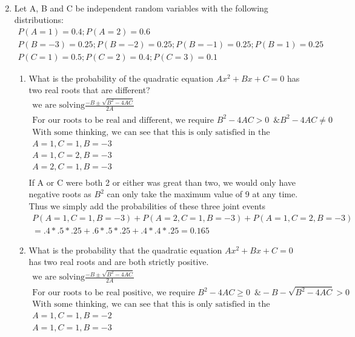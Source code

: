 \documentclass[11pt]{article}
\begin{document}
\begin{enumerate}
\begin{enumerate}
\begin{gather}
	\end{gather}
\end{enumerate}
\item
Let A, B and C be independent random variables with the following distributions:
\begin{gather}
	P(A = 1) = 0.4; P(A = 2) = 0.6\\
	P(B = -3) = 0.25; P(B = -2) = 0.25; P(B = -1) = 0.25; P(B = 1) = 0.25\\
	P(C = 1) = 0.5; P(C = 2) = 0.4; P(C = 3) = 0.1
\end{gather}
\begin{enumerate}
	\item What is the probability of the quadratic equation $Ax^2+Bx+C=0$ has two real roots that are different?
	\begin{gather}
		\text{we are solving} \frac{-B \pm \sqrt{B^2-4AC}}{2A}\\
		\text{For our roots to be real and different, we require } B^2-4AC > 0 \, \, \, \& B^2-4AC \ne 0\\
		\text{With some thinking, we can see that this is only satisfied in the following cases}\\
		A=1,C=1,B=-3\\
		A=1,C=2,B=-3\\
		A=2,C=1,B=-3\\
	\end{gather}
	If A or C were both 2 or either was great than two, we would only have negative roots as $B^2$ can only take the maximum value of 9 at any time.\\
	Thus we simply add the probabilities of these three joint events
	\begin{gather}
		P(A=1,C=1,B=-3)+P(A=2,C=1,B=-3)+P(A=1,C=2,B=-3)\\
		 = .4*.5*.25+.6*.5*.25+.4*.4*.25 = 0.165
	\end{gather}
	\item What is the probability that the quadratic equation  $Ax^2+Bx+C=0$
	has two real roots and are both strictly positive.
	\begin{gather}
	\text{we are solving} \frac{-B \pm \sqrt{B^2-4AC}}{2A}\\
	\text{For our roots to be real positive, we require } B^2-4AC \ge 0 \, \, \, \& -B - \sqrt{B^2-4AC} > 0\\
	\text{With some thinking, we can see that this is only satisfied in the following cases}\\
	A=1,C=1,B=-2\\
	A=1,C=1,B=-3\\

\end{gather}
\end{enumerate}
\end{enumerate}
\end{document}
